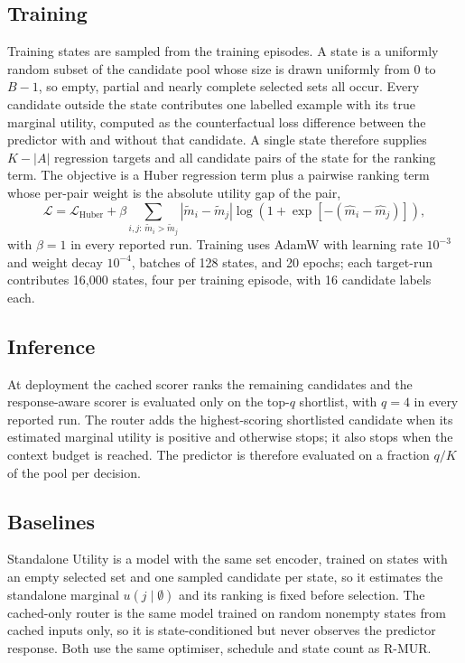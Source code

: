 \documentclass[preprint,12pt]{elsarticle}
\begin{document}
\subsection{Training}
Training states are sampled from the training episodes. A state is a uniformly
random subset of the candidate pool whose size is drawn uniformly from $0$ to
$B-1$, so empty, partial and nearly complete selected sets all occur. Every
candidate outside the state contributes one labelled example with its true
marginal utility, computed as the counterfactual loss difference between the
predictor with and without that candidate. A single state therefore supplies
$K-|A|$ regression targets and all candidate pairs of the state for the ranking
term. The objective is a Huber regression term plus a pairwise ranking term
whose per-pair weight is the absolute utility gap of the pair,
\begin{equation}
 \mathcal L
 =
 \mathcal L_{\mathrm{Huber}}
 +
 \beta
 \sum_{i,j:\,\widetilde m_i>\widetilde m_j}
 |\widetilde m_i-\widetilde m_j|
 \log\!\left(1+\exp\!\left[-(\widehat m_i-\widehat m_j)\right]\right),
\end{equation}
with $\beta=1$ in every reported run. Training uses AdamW with learning rate
$10^{-3}$ and weight decay $10^{-4}$, batches of 128 states, and 20 epochs;
each target-run contributes 16{,}000 states, four per training episode, with 16
candidate labels each.

\subsection{Inference}
At deployment the cached scorer ranks the remaining candidates and the
response-aware scorer is evaluated only on the top-$q$ shortlist, with $q=4$ in
every reported run. The router adds the highest-scoring shortlisted candidate
when its estimated marginal utility is positive and otherwise stops; it also
stops when the context budget is reached. The predictor is therefore evaluated
on a fraction $q/K$ of the pool per decision.

\subsection{Baselines}
\label{sec:supp-baselines}
Standalone Utility is a model with the same set encoder, trained on states with
an empty selected set and one sampled candidate per state, so it estimates the
standalone marginal $u(j\mid\emptyset)$ and its ranking is fixed before
selection. The cached-only router is the same model trained on random nonempty
states from cached inputs only, so it is state-conditioned but never observes
the predictor response. Both use the same optimiser, schedule and state count
as R-MUR.
\end{document}
